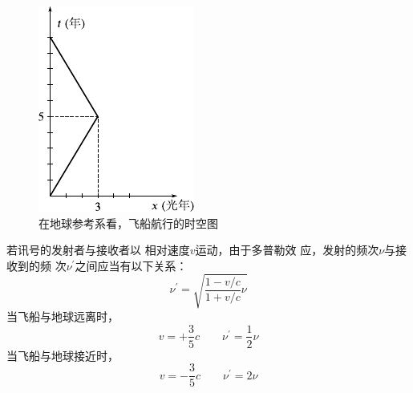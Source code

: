 \begin{figure}
    \centering
    \includegraphics{figure/fig11.02}
    \caption{在地球参考系看，飞船航行的时空图}
    \label{fig:11.02}
\end{figure}
若讯号的发射者与接收者以
相对速度$ v $运动，由于多普勒效
应，发射的频次$ \nu $与接收到的频
次$ \nu ^ \prime $之间应当有以下关系：
{\setlength{\mathindent}{4em}
\begin{equation*}
    \nu ^ { \prime } = \sqrt { \frac { 1 - v / c } { 1 + v / c }  \nu }
\end{equation*}}
当飞船与地球远离时，
{\setlength{\mathindent}{4em}
\begin{equation*}
    v = + \frac { 3 } { 5 } c \qquad  \nu ^ { \prime } = \frac 1 2 \nu
\end{equation*}}
当飞船与地球接近时，
{\setlength{\mathindent}{4em}
\begin{equation*}
    v = - \frac { 3 } { 5 } c \qquad  \nu ^ { \prime } = 2 \nu
\end{equation*}}

